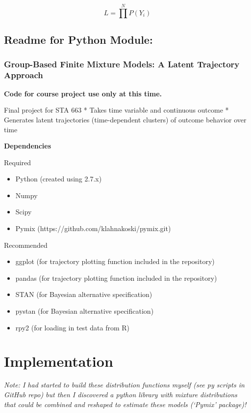 \documentclass{article}
\begin{document}
\[L = \prod^N P(Y_i)\tag{2}\]

    \subsection{Readme for Python Module:}\label{readme-for-python-module}

\subsubsection{Group-Based Finite Mixture Models: A Latent Trajectory
Approach}\label{group-based-finite-mixture-models-a-latent-trajectory-approach}

\textbf{Code for course project use only at this time.}

Final project for STA 663 * Takes time variable and continuous outcome *
Generates latent trajectories (time-dependent clusters) of outcome
behavior over time

\textbf{Dependencies}

Required

\begin{itemize}
\itemsep1pt\parskip0pt
\item
  Python (created using 2.7.x)
\item
  Numpy
\item
  Scipy
\item
  Pymix (https://github.com/klahnakoski/pymix.git)
\end{itemize}

Recommended

\begin{itemize}
\itemsep1pt\parskip0pt
\item
  ggplot (for trajectory plotting function included in the repository)
\item
  pandas (for trajectory plotting function included in the repository)
\item
  STAN (for Bayesian alternative specification)
\item
  pystan (for Bayesian alternative specification)
\item
  rpy2 (for loading in test data from R)
\end{itemize}

    \section{Implementation}\label{implementation}

    \emph{Note: I had started to build these distribution functions myself
(see py scripts in GitHub repo) but then I discovered a python library
with mixture distributions that could be combined and reshaped to
estimate these models (`Pymix' package)!}
\end{document}
